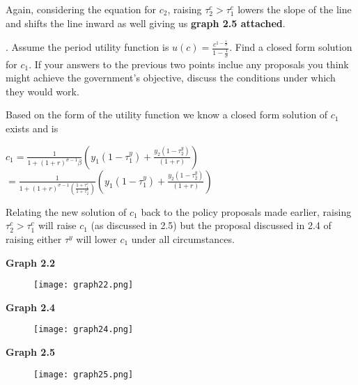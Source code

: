 \documentclass[11pt]{SelfArxOneColBMN}
\begin{document}
\begin{solution}
  Again, considering the equation for $c_2$, raising $\tau_2^c > \tau_1^c$ lowers the slope of the line and shifts the line inward as well giving us \textbf{graph 2.5 attached}.
\end{solution}
. Assume the period utility function is $u(c) = \frac{c^{1 - \frac{1}{\sigma}}}{1 - \frac{1}{\sigma}}$. Find a closed form solution for $c_1$. If your answers to the previous two points inclue any proposals you think might achieve the government's objective, discuss the conditions under which they would work.\\
\begin{solution}
  Based on the form of the utility function we know a closed form solution of $c_1$ exists and is
  \begin{center}
    $c_1 = \frac{1}{1 + (1 + r)^{\sigma - 1}\beta}(y_1(1 - \tau_1^y) + \frac{y_2(1 - \tau_2^y)}{(1 + r)})$\\
    $= \frac{1}{1 + (1 + r)^{\sigma - 1}(\frac{1 + \tau_1^c}{1 + \tau_2^c})}(y_1(1 - \tau_1^y) + \frac{y_2(1 - \tau_2^y)}{(1 + r)})$
  \end{center}
  Relating the new solution of $c_1$ back to the policy proposals made earlier, raising $\tau_2^c > \tau_1^c$ will raise $c_1$ (as discussed in 2.5) but the proposal discussed in 2.4 of raising either $\tau^y$ will lower $c_1$ under all circumstances.
\end{solution}

\newpage
\clearpage
\noindent \textbf{Graph 2.2}
\begin{figure}[h]
        \texttt{[image: graph22.png]}
\end{figure}
\clearpage
\noindent \textbf{Graph 2.4}
\begin{figure}[h]
        \texttt{[image: graph24.png]}
\end{figure}
\newpage
\clearpage
\noindent \textbf{Graph 2.5}
\begin{figure}[h]
        \texttt{[image: graph25.png]}
\end{figure}
\end{document}
